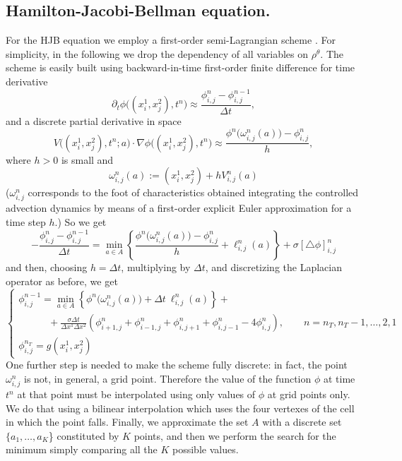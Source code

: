\documentclass{cmslatex}
\newcommand{\rtheta}{\rho^\theta}
\newcommand{\Dx}{\Delta x^1}
\newcommand{\Dy}{\Delta x^2}
\newcommand{\Dt}{\Delta t}
\begin{document}
\subsection{Hamilton-Jacobi-Bellman equation.}\label{sec:numerics:HJB}
For the HJB equation we employ a first-order semi-Lagrangian scheme \cite{cacace2014, falconebook}. For simplicity, in the following we drop the dependency of all variables on $\rtheta$.
The scheme is easily built using backward-in-time first-order finite difference for time derivative
$$
\partial_t\phi\big( (x^1_i, x^2_j),t^n\big) \approx 
\frac{\phi^{n}_{i,j}-\phi^{n-1}_{i,j}}{\Dt},
$$ 
and a discrete partial derivative in space
$$
V\big( (x^1_i, x^2_j),t^n;a\big)\cdot\nabla\phi\big( (x^1_i, x^2_j),t^n\big) \approx
\frac{\phi^n\big(\omega^n_{i,j}(a)\big)-\phi^n_{i,j}}{h},
$$
where $h>0$ is small and
$$
\omega^n_{i,j}(a):=(x^1_i, x^2_j)+h V^n_{i,j}(a)
$$
($\omega^n_{i,j}$ corresponds to the foot of characteristics obtained integrating the controlled advection dynamics by means of a first-order explicit Euler approximation for a time step $h$.)
So we get 
$$
-\frac{\phi^{n}_{i,j}-\phi^{n-1}_{i,j}}{\Dt}=
\min_{a\in A}
\left\{\frac{\phi^n\big(\omega^n_{i,j}(a)\big)-\phi^n_{i,j}}{h}+\ell^n_{i,j}(a)\right\}
+\sigma[\triangle\phi]^n_{i,j}
$$
and then, choosing $h=\Dt$, multiplying by $\Dt$, and discretizing the Laplacian operator as before, we get  
\begin{equation}\label{schema_SL}
\left\{
\begin{array}{l}
\displaystyle
\phi^{n-1}_{i,j} = 
\min\limits_{a\in A}\left\{\phi^n\big(\omega^n_{i,j}(a)\big)+\Dt \ \ell^n_{i,j}(a)\right\}+ \\ [3mm] 
\qquad\quad +\frac{\sigma\Dt}{\Dx\Dy} \left(\phi^{n}_{i+1,j}+\phi^{n}_{i-1,j}+\phi^{n}_{i,j+1}+\phi^{n}_{i,j-1}-4\phi^{n}_{i,j}\right), 
 \qquad n=n_T,n_T-1,\ldots,2,1 \\ [5mm]
\phi^{n_T}_{i,j} = g(x^1_i,x^2_j)
\end{array}
\right. 
\end{equation}
One further step is needed to make the scheme fully discrete: 
in fact, the point $\omega^n_{i,j}$ is not, in general, a grid point. Therefore the value of the function $\phi$ at time $t^n$ at that point must be interpolated using only values of $\phi$ at grid points only. 
We do that using a bilinear interpolation which uses the four vertexes of the cell in which the point falls.
Finally, we approximate the set $A$ with a discrete set $\{a_1,\ldots,a_K$\} constituted by $K$ points, and then we perform the search for the minimum simply comparing all the $K$ possible values.
\end{document}
